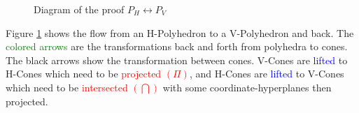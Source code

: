 \newcommand{\vtohcolor}{green}
\newcommand{\liftcolor}{blue}
\newcommand{\dropcolor}{red}
\newcommand{\dpos}{-2}
\newcommand{\mhpos}{\numexpr \dpos+1}
\newcommand{\mlpos}{\numexpr \dpos-1}
\newcommand{\PHdesc}{A\x \leq \b}
\newcommand{\CHdesc}{[-\b|A]\smallstack{x_0}{\x} \leq \vec{0}}
\newcommand{\CVpdesc}{\cone\{\pm\smallstack{\e_i}{A^i}\cup\smallstack{0}{\e_j}\}}
\newcommand{\CHpdesc}{\begin{pmatrix*}[r] \0 & -I \\ I & -U \\ -I & U \end{pmatrix*}\x \leq \0}
\newcommand{\CVdesc}{\cone\{\smallstack{\vec{0}}{U'}\cup\smallstack{\vec{1}}{V'}\}}
\newcommand{\PVdesc}{\cone(U)\oplus\conv(V)}
\begin{figure}[H]
\begin{centering}
\caption{Diagram of the proof $P_H \leftrightarrow P_V$}
\label{fig:h_to_v}
\end{centering}
\end{figure}

Figure \ref{fig:h_to_v} shows the flow from an H-Polyhedron to a V-Polyhedron and back.  The \textcolor{\vtohcolor}{colored arrows} are the transformations back and forth from polyhedra to cones.  The black arrows show the transformation between cones.  V-Cones are \textcolor{\liftcolor}{lifted} to H-Cones which need to be \textcolor{\dropcolor}{projected $(\Pi)$}, and H-Cones are \textcolor{\liftcolor}{lifted} to V-Cones which need to be \textcolor{\dropcolor}{intersected $(\bigcap)$} with some coordinate-hyperplanes then projected.
